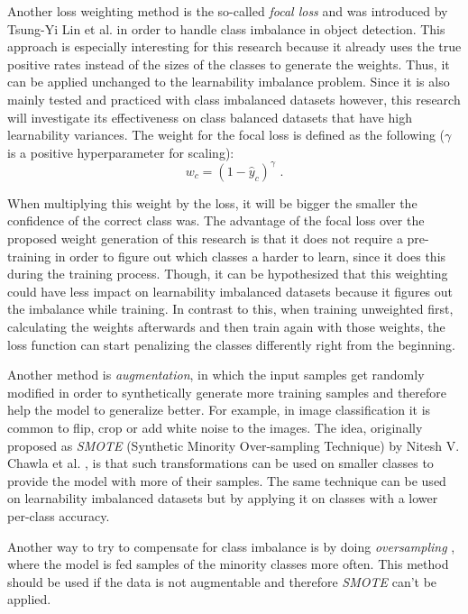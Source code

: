 \documentclass[journal]{IEEEtran}
\begin{document}
Another loss weighting method is the so-called \emph{focal loss} and was introduced by Tsung-Yi Lin et al. \cite{lin2017focal} in order to handle class imbalance in object detection.
This approach is especially interesting for this research because it already uses the true positive rates instead of the sizes of the classes to generate the weights.
Thus, it can be applied unchanged to the learnability imbalance problem.
Since it is also mainly tested and practiced with class imbalanced datasets however, this research will investigate its effectiveness on class balanced datasets that have high learnability variances.
The weight for the focal loss is defined as the following ($\gamma$ is a positive hyperparameter for scaling):
\[ w_c = (1 - \hat{y}_c)^\gamma \text{ .} \]

When multiplying this weight by the loss, it will be bigger the smaller the confidence of the correct class was. 
The advantage of the focal loss over the proposed weight generation of this research is that it does not require a pre-training in order to figure out which classes a harder to learn, since it does this during the training process.
Though, it can be hypothesized that this weighting could have less impact on learnability imbalanced datasets because it figures out the imbalance while training.
In contrast to this, when training unweighted first, calculating the weights afterwards and then train again with those weights, the loss function can start penalizing the classes differently right from the beginning.

Another method is \emph{augmentation}, in which the input samples get randomly modified in order to synthetically generate more training samples and therefore help the model to generalize better. 
For example, in image classification it is common to flip, crop or add white noise to the images. 
The idea, originally proposed as \emph{SMOTE} (Synthetic Minority Over-sampling Technique) by Nitesh V. Chawla et al. \cite{chawla2002smote}, is that such transformations can be used on smaller classes to provide the model with more of their samples.
The same technique can be used on learnability imbalanced datasets but by applying it on classes with a lower per-class accuracy.

Another way to try to compensate for class imbalance is by doing \emph{oversampling} \cite{chawla2002smote}, where the model is fed samples of the minority classes more often.
This method should be used if the data is not augmentable and therefore \emph{SMOTE} can't be applied.
\end{document}
